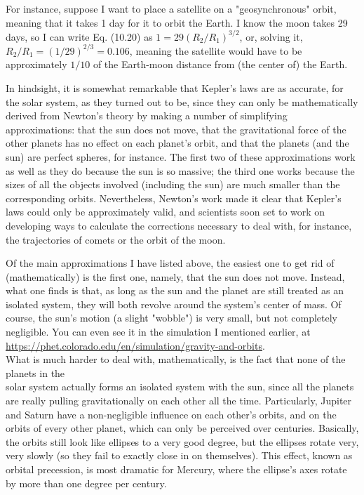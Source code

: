 \documentclass[10pt]{article}
\begin{document}
For instance, suppose I want to place a satellite on a "geosynchronous" orbit, meaning that it takes 1 day for it to orbit the Earth. I know the moon takes 29 days, so I can write Eq. (10.20) as $1=29\left(R_{2} / R_{1}\right)^{3 / 2}$, or, solving it, $R_{2} / R_{1}=(1 / 29)^{2 / 3}=0.106$, meaning the satellite would have to be approximately $1 / 10$ of the Earth-moon distance from (the center of) the Earth.

In hindsight, it is somewhat remarkable that Kepler's laws are as accurate, for the solar system, as they turned out to be, since they can only be mathematically derived from Newton's theory by making a number of simplifying approximations: that the sun does not move, that the gravitational force of the other planets has no effect on each planet's orbit, and that the planets (and the sun) are perfect spheres, for instance. The first two of these approximations work as well as they do because the sun is so massive; the third one works because the sizes of all the objects involved (including the sun) are much smaller than the corresponding orbits. Nevertheless, Newton's work made it clear that Kepler's laws could only be approximately valid, and scientists soon set to work on developing ways to calculate the corrections necessary to deal with, for instance, the trajectories of comets or the orbit of the moon.

Of the main approximations I have listed above, the easiest one to get rid of (mathematically) is the first one, namely, that the sun does not move. Instead, what one finds is that, as long as the sun and the planet are still treated as an isolated system, they will both revolve around the system's center of mass. Of course, the sun's motion (a slight "wobble") is very small, but not completely negligible. You can even see it in the simulation I mentioned earlier, at\\
\href{https://phet.colorado.edu/en/simulation/gravity-and-orbits}{https://phet.colorado.edu/en/simulation/gravity-and-orbits}.\\
What is much harder to deal with, mathematically, is the fact that none of the planets in the\\
solar system actually forms an isolated system with the sun, since all the planets are really pulling gravitationally on each other all the time. Particularly, Jupiter and Saturn have a non-negligible influence on each other's orbits, and on the orbits of every other planet, which can only be perceived over centuries. Basically, the orbits still look like ellipses to a very good degree, but the ellipses rotate very, very slowly (so they fail to exactly close in on themselves). This effect, known as orbital precession, is most dramatic for Mercury, where the ellipse's axes rotate by more than one degree per century.
\end{document}
